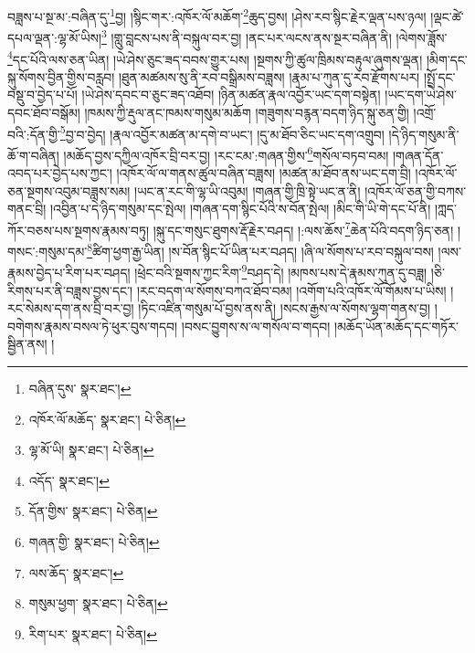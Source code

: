 བཟླས་པ་སྔ་མ་:བཞིན་དུ་\footnote{བཞིན་དུས་  སྣར་ཐང་། }བྱ། །སྙིང་གར་:འཁོར་ལོ་མཆོག་\footnote{འཁོར་ལོ་མཆོད་  སྣར་ཐང་།  པེ་ཅིན། }ཆུད་བྱས། །ཤེས་རབ་སྙིང་རྗེར་ལྡན་པས་ཉལ། །ལྡང་ཚེ་དཔལ་ལྡན་:ལྷ་མོ་ཡིས།\footnote{ལྷ་མོ་ཡི།  སྣར་ཐང་།  པེ་ཅིན། } །གླུ་བླངས་པས་ནི་བསྐུལ་བར་བྱ། །ནང་པར་ལངས་ནས་སྔར་བཞིན་ནི། །ལེགས་ཟློས་\footnote{འདོད་  སྣར་ཐང་། }དང་པོའི་ལས་ཅན་ཡིན། །ཡེ་ཤེས་ཅུང་ཟད་བབས་གྱུར་པས། །སྔགས་ཀྱི་ཚུལ་ཁྲིམས་བརྟུལ་ཞུགས་ལྡན། །མིག་དང་སྐུ་སོགས་བྱིན་གྱིས་བརླབ། །ཐུན་མཚམས་སུ་ནི་རབ་བསྒྲིམས་བཟླས། །རྣམ་པ་ཀུན་དུ་རབ་རྫོགས་པར། །སྤྲོ་དང་བསྡུ་བ་བྱེད་པ་པོ། །ཡེ་ཤེས་དབང་བ་ཅུང་ཟད་འཐོབ། །ཉིན་མཚན་རྣལ་འབྱོར་ཡང་དག་བསྟེན། །ཡང་དག་ཡེ་ཤེས་དབང་ཐོབ་བསྒོམ། །ཁམས་ཀྱི་རྡུལ་ནང་ཁམས་གསུམ་མཆོག །གཟུགས་བརྙན་བདག་ཉིད་སྐུ་ཅན་གྱི། །འགྲོ་བའི་:དོན་གྱི་\footnote{དོན་གྱིས་  སྣར་ཐང་།  པེ་ཅིན། }བྱ་བ་བྱེད། །རྣལ་འབྱོར་མཚན་མ་དགེ་བ་ཡང་། །དུ་མ་ཐོབ་ཅིང་ཡང་དག་འགྲུབ། །དེ་ཉིད་གསུམ་ནི་ཆོ་ག་བཞིན། །མཆོད་བྱས་དཀྱིལ་འཁོར་བྲི་བར་བྱ། །རང་ངམ་:གཞན་གྱིས་\footnote{གཞན་གྱི་  སྣར་ཐང་།  པེ་ཅིན། }གསོལ་བཏབ་བམ། །གཞན་དོན་འབད་པར་བྱེད་པས་ཀྱང་། །འཁོར་ལོ་ལ་གནས་ཚུལ་བཞིན་བཟླས། །མཚན་མ་ཐོབ་ནས་ཡང་དག་བྲི། །འཁོར་ལོ་ཅན་སྔགས་འབུམ་བཟླས་སམ། །ཡང་ན་རང་གི་ལྷ་ཡི་འབུམ། །གཞན་གྱི་ཁྲི་སྟེ་ཡང་ན་ནི། །འཁོར་ལོ་ཅན་གྱི་བཀས་གནང་བྲི། །འབྱིན་པ་དེ་ཉིད་གསུམ་དང་སྤེལ། །གཞན་དག་སྙིང་པོའི་ས་བོན་སྤེལ། །མིང་གི་ཡི་གེ་དང་པོ་ནི། །ཀླད་ཀོར་བཅས་པས་སྔགས་རྣམས་བཏུ། །སྐུ་དང་གསུང་ཐུགས་རྡོ་རྗེར་བཤད། །:ལས་ཆོས་\footnote{ལས་ཆོད་  སྣར་ཐང་། }ཆེན་པོའི་བདག་ཉིད་ཅན། །གསང་:གསུམ་དམ་\footnote{གསུམ་ཕྱག་  སྣར་ཐང་།  པེ་ཅིན། }ཚིག་ཕྱག་རྒྱ་ཡིན། །ས་བོན་སྙིང་པོ་ཡིན་པར་བཤད། །ཞི་ལ་སོགས་པ་རབ་བསྐུལ་བས། །ལས་རྣམས་བྱེད་པ་རིག་པར་བཤད། །ཕྲེང་བའི་སྔགས་ཀྱང་རིག་\footnote{རིག་པར་  སྣར་ཐང་།  པེ་ཅིན། }བཤད་དེ། །མཁས་པས་དེ་རྣམས་ཀུན་དུ་བཟླ། །ཅི་རིགས་པར་ནི་བཟླས་བྱས་དང་། །རང་བདག་ལ་སོགས་བཀའ་ཐོབ་བམ། །འགོག་པའི་འཁོར་ལོ་གོམས་པ་ཡིས། །རང་སེམས་དག་ནས་བྲི་བར་བྱ། །ཏིང་འཛིན་གསུམ་པོ་བྱས་ནས་ནི། །སངས་རྒྱས་ལ་སོགས་ལྷག་གནས་བྱ། །བགེགས་རྣམས་བསལ་ཏེ་ཕུར་བུས་གདབ། །བསང་བྱུགས་ས་ལ་གསོལ་བ་གདབ། །མཆོད་ཡོན་མཆོད་དང་གཏོར་སྦྱིན་ནས། །
